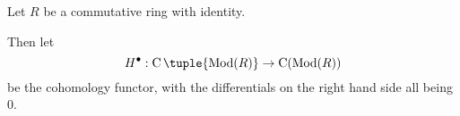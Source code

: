 \begin{notation}
    Let \( R \) be a commutative ring with identity.

    Then let
    \[
        H^\bullet: \C\tuple{\Mod(R)} \to \C(\Mod(R))
    \]
    be the cohomology functor, with the differentials on the right hand side all being \( 0 \).
\end{notation}







